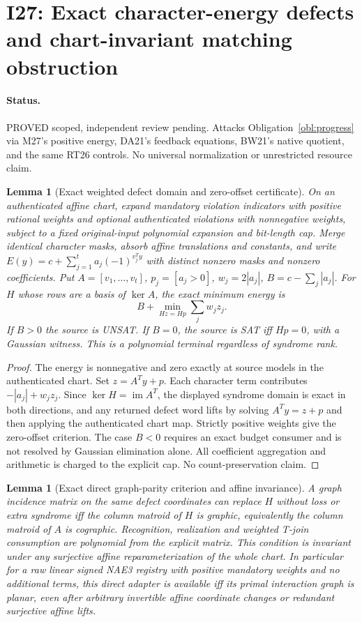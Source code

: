 \documentclass[11pt]{article}
\newtheorem{lemma}[theorem]{Lemma}
\begin{document}
\section{I27: Exact character-energy defects and chart-invariant matching obstruction}\label{sec:i27}
\paragraph{Status.} PROVED scoped, independent review pending. Attacks Obligation~\ref{obl:progress} via M27's positive energy, DA21's feedback equations, BW21's native quotient, and the same RT26 controls. No universal normalization or unrestricted resource claim.
\begin{lemma}[Exact weighted defect domain and zero-offset certificate]\label{lem:i27-defect}
On an authenticated affine chart, expand mandatory violation indicators with positive rational weights and optional authenticated violations with nonnegative weights, subject to a fixed original-input polynomial expansion and bit-length cap. Merge identical character masks, absorb affine translations and constants, and write $E(y)=c+\sum_{j=1}^t a_j(-1)^{v_j^Ty}$ with distinct nonzero masks and nonzero coefficients. Put $A=[v_1,\ldots,v_t]$, $p_j=[a_j>0]$, $w_j=2|a_j|$, $B=c-\sum_j|a_j|$. For $H$ whose rows are a basis of $\ker A$, the exact minimum energy is
\[
 B+\min_{Hz=Hp}\sum_j w_j z_j.
\]
If $B>0$ the source is UNSAT. If $B=0$, the source is SAT iff $Hp=0$, with a Gaussian witness. This is a polynomial terminal regardless of syndrome rank.
\end{lemma}
\begin{proof}
The energy is nonnegative and zero exactly at source models in the authenticated chart. Set $z=A^Ty+p$. Each character term contributes $-|a_j|+w_jz_j$. Since $\ker H=\operatorname{im}A^T$, the displayed syndrome domain is exact in both directions, and any returned defect word lifts by solving $A^Ty=z+p$ and then applying the authenticated chart map. Strictly positive weights give the zero-offset criterion. The case $B<0$ requires an exact budget consumer and is not resolved by Gaussian elimination alone. All coefficient aggregation and arithmetic is charged to the explicit cap. No count-preservation claim.
\end{proof}
\begin{lemma}[Exact direct graph-parity criterion and affine invariance]\label{lem:i27-cographic}
A graph incidence matrix on the same defect coordinates can replace $H$ without loss or extra syndrome iff the column matroid of $H$ is graphic, equivalently the column matroid of $A$ is cographic. Recognition, realization and weighted T-join consumption are polynomial from the explicit matrix. This condition is invariant under any surjective affine reparameterization of the whole chart. In particular for a raw linear signed NAE3 registry with positive mandatory weights and no additional terms, this direct adapter is available iff its primal interaction graph is planar, even after arbitrary invertible affine coordinate changes or redundant surjective affine lifts.
\end{lemma}
\end{document}
